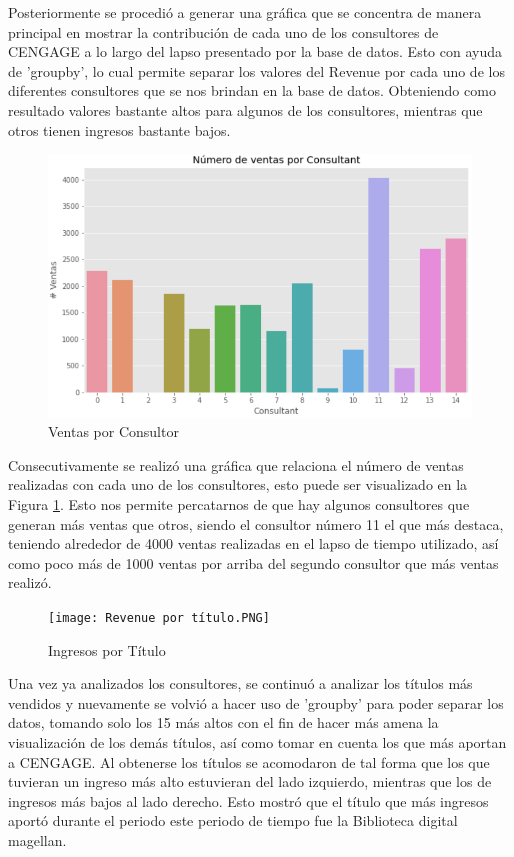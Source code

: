 \documentclass{article}
\begin{document}
        Posteriormente se procedió a generar una gráfica que se concentra de manera principal en mostrar la contribución de cada uno de los consultores de CENGAGE a lo largo del lapso presentado por la base de datos. Esto con ayuda de 'groupby', lo cual permite separar los valores del Revenue por cada uno de los diferentes consultores que se nos brindan en la base de datos. Obteniendo como resultado valores bastante altos para algunos de los consultores, mientras que otros tienen ingresos bastante bajos.

        \begin{figure}[h!]
            \centering
            \includegraphics[width = \columnwidth]{Ventas por Consultor.PNG}
            \caption{Ventas por Consultor}
            \label{fig:ventConsultor}
        \end{figure}

        Consecutivamente se realizó una gráfica que relaciona el número de ventas realizadas con cada uno de los consultores, esto puede ser visualizado en la Figura \ref{fig:ventConsultor}. Esto nos permite percatarnos de que hay algunos consultores que generan más ventas que otros, siendo el consultor número 11 el que más destaca, teniendo alrededor de 4000 ventas realizadas en el lapso de tiempo utilizado, así como poco más de 1000 ventas por arriba del segundo consultor que más ventas realizó.


        \begin{figure}[h!]
            \centering
            \texttt{[image: Revenue por título.PNG]}
            \caption{Ingresos por Título}
            \label{fig:revTítulo}
        \end{figure}

        Una vez ya analizados los consultores, se continuó a analizar los títulos más vendidos y nuevamente se volvió a hacer uso de 'groupby' para poder separar los datos, tomando solo los 15 más altos con el fin de hacer más amena la visualización de los demás títulos, así como tomar en cuenta los que más aportan a CENGAGE. Al obtenerse los títulos se acomodaron de tal forma que los que tuvieran un ingreso más alto estuvieran del lado izquierdo, mientras que los de ingresos más bajos al lado derecho. Esto mostró que el título que más ingresos aportó durante el periodo este periodo de tiempo fue la Biblioteca digital magellan.
\end{document}

